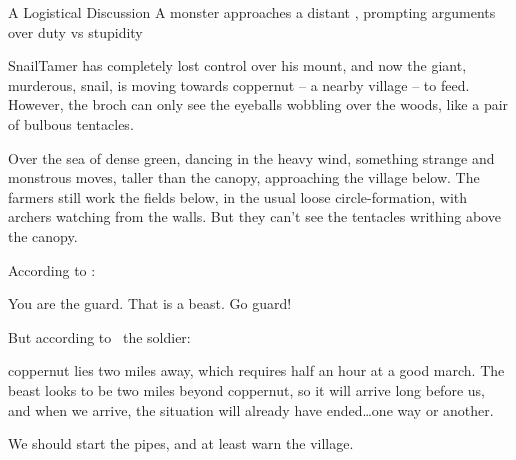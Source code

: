 \renewcommand\csComments{
  \draw[very thick,gray] (12,0.6) -- (13,0.6) node[anchor=north]{\outline{1 Mile}} -- (17,0.6) node[anchor=north]{\outline{5 Miles}} ;
}




{A Logistical Discussion}%
{A monster approaches a distant , prompting arguments over duty vs stupidity}%

\Gls{SnailTamer} has completely lost control over his mount, and now the giant, murderous, snail, is moving towards \gls{coppernut} -- a nearby \gls{village} -- to feed.
However, the \gls{broch} can only see the eyeballs wobbling over the woods, like a pair of bulbous tentacles.

\begin{boxtext}
  Over the sea of dense green, dancing in the heavy wind, something strange and monstrous moves, taller than the canopy, approaching the \gls{village} below.
  The farmers still work the fields below, in the usual loose circle-formation, with archers watching from the walls.
  But they can't see the tentacles writhing above the canopy.
\end{boxtext}

According to :

\begin{speechtext}
  You are the \gls{guard}.
  That is a beast.
  Go guard!
\end{speechtext}

But according to \composeHumanName\ the \gls{soldier}:

\begin{speechtext}
  \Gls{coppernut} lies two miles away, which requires half an hour at a good march.
  The beast looks to be two miles beyond \gls{coppernut}, so it will arrive long before us, and when we arrive, the situation will already have ended\ldots one way or another.

  We should start the pipes, and at least warn the \gls{village}.
\end{speechtext}

